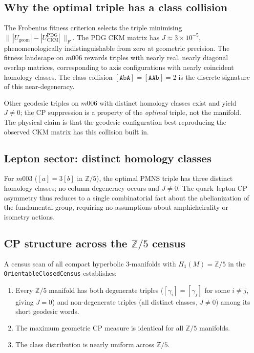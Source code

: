 ﻿\documentclass[12pt]{article}
\theoremstyle{definition}
\begin{document}
\subsection{Why the optimal triple has a class collision}

The Frobenius fitness criterion selects the triple minimising
$\|\,|U_\text{geom}|-|U_\text{CKM}^\text{PDG}|\,\|_F$.
The PDG CKM matrix has $J\approx 3\times 10^{-5}$, phenomenologically
indistinguishable from zero at geometric precision.
The fitness landscape on $m006$ rewards triples with nearly real,
nearly diagonal overlap matrices, corresponding to axis configurations
with nearly coincident homology classes.
The class collision $[\texttt{AbA}]=[\texttt{AAb}]=2$ is the discrete
signature of this near-degeneracy.

Other geodesic triples on $m006$ with distinct homology classes exist
and yield $J\neq 0$; the CP suppression is a property of the
\emph{optimal} triple, not the manifold.
The physical claim is that the geodesic configuration best reproducing
the observed CKM matrix has this collision built in.

\subsection{Lepton sector: distinct homology classes}

For $m003$ ($[a]=3[b]$ in $\mathbb{Z}/5$), the optimal PMNS triple
has three distinct homology classes; no column degeneracy occurs
and $J\neq 0$.
The quark--lepton CP asymmetry thus reduces to a single combinatorial
fact about the abelianization of the fundamental group, requiring
no assumptions about amphicheirality or isometry actions.


\subsection{CP structure across the $\mathbb{Z}/5$ census}
\label{subsec:z5_census}

A census scan of all compact hyperbolic 3-manifolds with $H_1(M)=\mathbb{Z}/5$ in the \texttt{OrientableClosedCensus} establishes:
\begin{enumerate}
\item Every $\mathbb{Z}/5$ manifold has both degenerate triples
($[\gamma_i]=[\gamma_j]$ for some $i\neq j$, giving $J=0$) and
non-degenerate triples (all distinct classes, $J\neq 0$) among its short geodesic words.
\item The maximum geometric CP measure is identical for all $\mathbb{Z}/5$ manifolds.
\item The class distribution is nearly uniform across $\mathbb{Z}/5$.
\end{enumerate}
\end{document}

